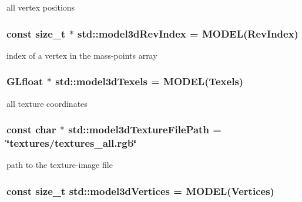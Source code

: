 all vertex positions 

\hypertarget{namespacestd_a13dd980059224bfd90cd1fde9aa706a9}{}
\subsubsection[{model3d\+Rev\+Index}]{\setlength{\rightskip}{0pt plus 5cm}const size\+\_\+t $\ast$ std\+::model3d\+Rev\+Index = {\bf M\+O\+D\+E\+L}(Rev\+Index)}\label{namespacestd_a13dd980059224bfd90cd1fde9aa706a9}


index of a vertex in the mass-\/points array 

\hypertarget{namespacestd_a75a224804224819d960875bd982ce0c6}{}
\subsubsection[{model3d\+Texels}]{\setlength{\rightskip}{0pt plus 5cm}G\+Lfloat $\ast$ std\+::model3d\+Texels = {\bf M\+O\+D\+E\+L}(Texels)}\label{namespacestd_a75a224804224819d960875bd982ce0c6}


all texture coordinates 

\hypertarget{namespacestd_ab193fa08b6666c1bca6ccbb53acd58f6}{}
\subsubsection[{model3d\+Texture\+File\+Path}]{\setlength{\rightskip}{0pt plus 5cm}const char $\ast$ std\+::model3d\+Texture\+File\+Path = \char`\"{}textures/textures\+\_\+all.\+rgb\char`\"{}}\label{namespacestd_ab193fa08b6666c1bca6ccbb53acd58f6}


path to the texture-\/image file 

\hypertarget{namespacestd_a2c56d5934d3e2877598b1eba9302a70f}{}
\subsubsection[{model3d\+Vertices}]{\setlength{\rightskip}{0pt plus 5cm}const size\+\_\+t std\+::model3d\+Vertices = {\bf M\+O\+D\+E\+L}(Vertices)}\label{namespacestd_a2c56d5934d3e2877598b1eba9302a70f}


